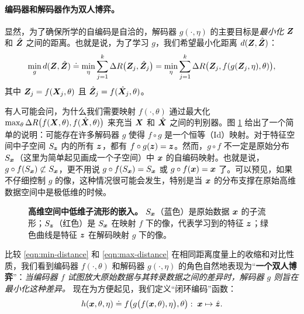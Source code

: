 \documentclass[../../book-main_zh.tex]{subfiles}
\begin{document}
\paragraph{编码器和解码器作为双人博弈。}
显然，为了确保所学的自编码是自洽的，解码器 $g(\cdot, \eta)$ 的主要目标是{\em 最小化} $\bm{Z}$ 和 $\hat {\bm{Z}}$ 之间的距离。也就是说，为了学习 $g$，我们希望最小化距离 $d(\bm{Z}, \hat {\bm{Z}})$：
\begin{equation}
\min_g d(\bm{Z}, \hat {\bm{Z}}) \doteq \min_\eta  \sum_{j=1}^k \Delta R\big(\bm{Z}_j, \hat{\bm{Z}}_j\big) =  \min_\eta  \sum_{j=1}^k \Delta R\big(\bm{Z}_j, f(g(\bm{Z}_j, \eta),\theta)\big),
\label{eqn:min-distance}
\end{equation}
其中 $\bm{Z}_j = f(\bm{X}_j,\theta)$ 且 $\hat {\bm{Z}}_j = f(\hat{\bm{X}}_j,\theta)$。

\begin{example}
有人可能会问，为什么我们需要映射 $f(\cdot, \theta)$ 通过最大化 $\max_\theta \Delta R\big(f(\bm{X},\theta), f(\hat {\bm{X}},\theta)\big)$ 来充当 $\bm{X}$ 和 $\hat {\bm{X}}$ 之间的判别器。图 \ref{fig:decoder} 给出了一个简单的说明：可能存在许多解码器 $g$ 使得 $f\circ g$ 是一个恒等（Id）映射。对于特征空间中子空间 $S_{\bm{z}}$ 内的所有 $\bm{z}$，都有 $f\circ g(\bm{z}) = \bm{z}$。然而，$g\circ f$ 不一定是原始分布 $S_{\bm{x}}$（这里为简单起见画成一个子空间）中 $\bm{x}$ 的自编码映射。也就是说，$g\circ f(S_{\bm{x}}) \not\subset S_{\bm{x}}$，更不用说 $g\circ f(S_{\bm{x}}) = S_{\bm{x}}$ 或 $g\circ f(\bm{x}) = \bm{x}$ 了。可以预见，如果不仔细控制 $g$ 的像，这种情况很可能会发生，特别是当 $\bm{x}$ 的分布支撑在原始高维数据空间中是极低维的时候。
\end{example}
\begin{figure}
\caption{\textbf{高维空间中低维子流形的嵌入。} $S_{\bm{x}}$（蓝色）是原始数据 $\bm{x}$ 的子流形；$S_{\bm{z}}$（红色）是 $S_{\bm{x}}$ 在映射 $f$ 下的像，代表学习到的特征 $\bm{z}$；绿色曲线是特征 $\bm{z}$ 在解码映射 $g$ 下的像。} \label{fig:decoder}
\end{figure} 

比较 \eqref{eqn:min-distance} 和 \eqref{eqn:max-distance} 在相同距离度量上的收缩和对比性质，我们看到编码器 $f(\cdot, \theta)$ 和解码器 $g(\cdot, \eta)$ 的角色自然地表现为“{\bf 一个双人博弈}”：{\em 当编码器 $f$ 试图放大原始数据与其转录数据之间的差异时，解码器 $g$ 则旨在最小化这种差异。} 现在为方便起见，我们定义“闭环编码”函数：
\begin{equation}
    h(\bm{x}, \theta, \eta) \doteq f\big(g\big(f(\bm{x}, \theta), \eta\big), \theta\big): \; \bm{x} \mapsto \hat {\bm{z}}.
\end{equation}
\end{document}
